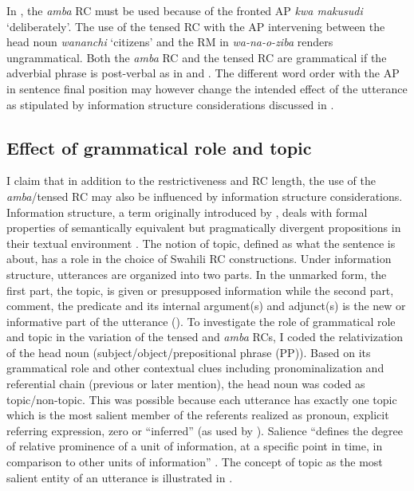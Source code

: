 \documentclass[output=paper,colorlinks,citecolor=brown]{langscibook}
\begin{document}
In , the \textit{amba} RC must be used because of the fronted AP \textit{kwa makusudi} ‘deliberately’. The use of the tensed RC with the AP intervening between the head noun \textit{wananchi} ‘citizens’ and the RM in \textit{wa-na-o-ziba} renders  ungrammatical. Both the \textit{amba} RC and the tensed RC are grammatical if the adverbial phrase is post-verbal as in  and . The different word order with the AP in sentence final position may however change the intended effect of the utterance as stipulated by information structure considerations discussed in .

\subsection{Effect of grammatical role and topic}\label{sec:mwamzandi:4.3}

I claim that in addition to the restrictiveness and RC length, the use of the \textit{amba}\slash tensed RC may also be influenced by information structure considerations. Information structure, a term originally introduced by \citet{Halliday1967}, deals with formal properties of semantically equivalent but pragmatically divergent propositions in their textual environment \citep{Lambrecht1994}. The notion of topic, defined as what the sentence is about, has a role in the choice of Swahili RC constructions. Under information structure, utterances are organized into two parts. In the unmarked form, the first part, the topic, is given or presupposed information while the second part, comment, the predicate and its internal argument(s) and adjunct(s) is the new or informative part of the utterance (\citealt{Prince1981, Prince1992, GundelFretheim2006}). To investigate the role of grammatical role and topic in the variation of the tensed and \textit{amba} RCs, I coded the relativization of the head noun (subject/object/prepositional phrase (PP)). Based on its grammatical role and other contextual clues including pronominalization and referential chain (previous or later mention), the head noun was coded as topic/non-topic. This was possible because each utterance has exactly one topic which is the most salient member of the referents realized as pronoun, explicit referring expression, zero or “inferred” (as used by \citealt{Prince1981}). Salience “defines the degree of relative prominence of a unit of information, at a specific point in time, in comparison to other units of information” \citep{ChiarcosEtAl2011Salience}. The concept of topic as the most salient entity of an utterance is illustrated in .
\end{document}
